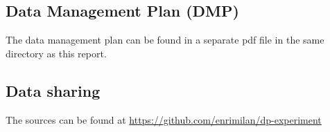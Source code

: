 \documentclass[12pt, a4paper]{article}
\begin{document}
\subsection{Data Management Plan (DMP)}
The data management plan can be found in a separate pdf file in the same directory as this report.

\subsection{Data sharing}
The sources can be found at \url{https://github.com/enrimilan/dp-experiment}
\end{document}
